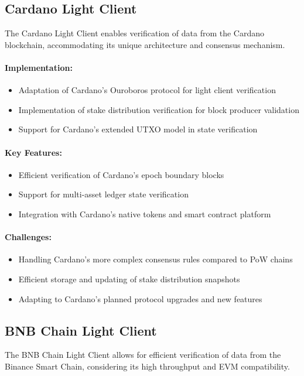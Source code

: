 \documentclass[12pt,a4paper]{article}
\begin{document}
	\subsection{Cardano Light Client}
	The Cardano Light Client enables verification of data from the Cardano blockchain, accommodating its unique architecture and consensus mechanism.
	
	\paragraph{Implementation:}
	\begin{itemize}
		\item Adaptation of Cardano's Ouroboros protocol for light client verification
		\item Implementation of stake distribution verification for block producer validation
		\item Support for Cardano's extended UTXO model in state verification
	\end{itemize}
	
	\paragraph{Key Features:}
	\begin{itemize}
		\item Efficient verification of Cardano's epoch boundary blocks
		\item Support for multi-asset ledger state verification
		\item Integration with Cardano's native tokens and smart contract platform
	\end{itemize}
	
	\paragraph{Challenges:}
	\begin{itemize}
		\item Handling Cardano's more complex consensus rules compared to PoW chains
		\item Efficient storage and updating of stake distribution snapshots
		\item Adapting to Cardano's planned protocol upgrades and new features
	\end{itemize}
	
	\subsection{BNB Chain Light Client}
	The BNB Chain Light Client allows for efficient verification of data from the Binance Smart Chain, considering its high throughput and EVM compatibility.
	
\end{document}
